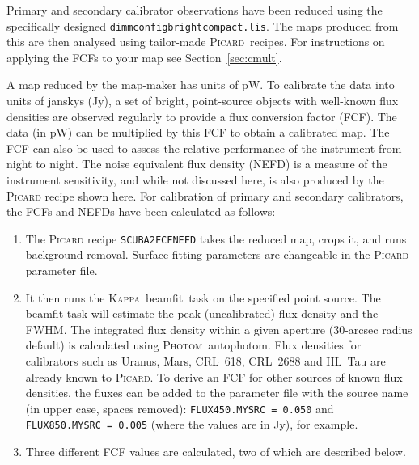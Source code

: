 \documentclass[twoside,11pt]{article}
\newcommand{\htmlref}[2]{#1}
\newcommand{\latexhtml}[2]{#1}
\newcommand{\xref}[3]{#1}
\renewcommand{\_}{\texttt{\symbol{95}}}
\newcommand{\Kappa}{\xref{\textsc{Kappa}}{sun95}{}}
\newcommand{\photom}{\xref{\textsc{Photom}}{sun45}{}}
\newcommand{\picard}{\xref{\textsc{Picard}}{sun265}{}}
\newcommand{\drrecipe}[1]{\texttt{#1}}
\newcommand{\task}[1]{\textsf{#1}}
\newcommand{\param}[1]{\texttt{#1}}
\newcommand{\file}[1]{\texttt{#1}}
\newcommand{\beamfit}{\xref{\task{beamfit}}{sun95}{BEAMFIT}}
\newcommand{\autophotom}{\xref{\task{autophotom}}{sun45}{AUTOPHOTOM}}
\newcommand{\cref}[3]{\latexhtml{#1~\ref{#2}}{\htmlref{#3}{#2}}}
\begin{document}
Primary and secondary calibrator observations have been reduced using
the specifically designed \file{dimmconfig\_bright\_compact.lis}.
The maps produced from this are then analysed using tailor-made
\picard\ recipes. For instructions on applying the FCFs to your map see
\cref{Section}{sec:cmult}{this page}.

A map reduced by the map-maker has units of pW. To calibrate the data
into units of janskys (Jy), a set of bright, point-source objects with
well-known flux densities are observed regularly to provide a flux
conversion factor (FCF). The data (in pW) can be multiplied by this FCF
to obtain a calibrated map. The FCF can also be used to assess the
relative performance of the instrument from night to night. The noise
equivalent flux density (NEFD) is a measure of the instrument
sensitivity, and while not discussed here, is also produced by the
\textsc{Picard} recipe shown here. For calibration of primary and secondary
calibrators, the FCFs and NEFDs have been calculated as follows:

\begin{enumerate}
\item{The \textsc{Picard} recipe \drrecipe{SCUBA2\_FCFNEFD} takes the reduced
map, crops it, and runs background removal. Surface-fitting
parameters are changeable in the \textsc{Picard} parameter file.}
\item{It then runs the \Kappa\ \beamfit\ task on the specified point
source. The \task{beamfit} task will estimate the peak (uncalibrated)
flux density and the FWHM. The integrated flux density within a
given aperture (30-arcsec radius default) is calculated using
\photom\ \autophotom. Flux densities for calibrators such as Uranus,
Mars, CRL~618, CRL~2688 and HL~Tau are already known to
\picard. To derive an FCF for other sources of known flux densities,
the fluxes can be added to the parameter file with the source name
(in upper case, spaces removed): \param{FLUX\_450.MYSRC~=~0.050}
and \param{FLUX\_850.MYSRC~=~0.005} (where the values are in Jy),
for example.}

\item {Three different FCF values are calculated, two of which are
described below.}
\end{enumerate}
\end{document}
